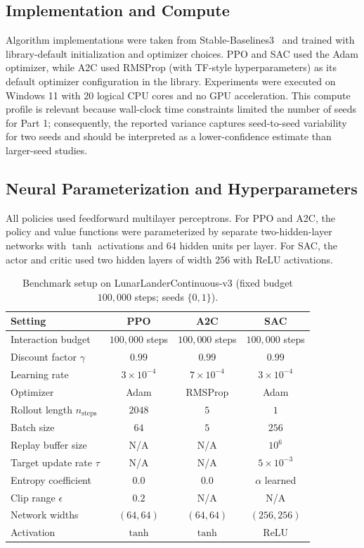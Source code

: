 \documentclass[a4paper,11pt,notitlepage]{report}
\begin{document}
\subsection{Implementation and Compute}
Algorithm implementations were taken from Stable-Baselines3~\cite{sb3} and trained with library-default initialization and optimizer choices. PPO and SAC used the Adam optimizer, while A2C used RMSProp (with TF-style hyperparameters) as its default optimizer configuration in the library. Experiments were executed on Windows 11 with 20 logical CPU cores and no GPU acceleration. This compute profile is relevant because wall-clock time constraints limited the number of seeds for Part 1; consequently, the reported variance captures seed-to-seed variability for two seeds and should be interpreted as a lower-confidence estimate than larger-seed studies.

\subsection{Neural Parameterization and Hyperparameters}
All policies used feedforward multilayer perceptrons. For PPO and A2C, the policy and value functions were parameterized by separate two-hidden-layer networks with $\tanh$ activations and $64$ hidden units per layer. For SAC, the actor and critic used two hidden layers of width $256$ with $\mathrm{ReLU}$ activations.

\begin{table}[H]
    \centering
    \caption{Benchmark setup on LunarLanderContinuous-v3 (fixed budget $100{,}000$ steps; seeds $\{0,1\}$).}
    \begin{tabular}{lccc}
        \toprule
        \textbf{Setting} & \textbf{PPO} & \textbf{A2C} & \textbf{SAC} \\
        \midrule
        Interaction budget & $100{,}000$ steps & $100{,}000$ steps & $100{,}000$ steps \\
        Discount factor $\gamma$ & $0.99$ & $0.99$ & $0.99$ \\
        Learning rate & $3\times 10^{-4}$ & $7\times 10^{-4}$ & $3\times 10^{-4}$ \\
        Optimizer & Adam & RMSProp & Adam \\
        Rollout length $n_{\mathrm{steps}}$ & $2048$ & $5$ & $1$ \\
        Batch size & $64$ & $5$ & $256$ \\
        Replay buffer size & N/A & N/A & $10^6$ \\
        Target update rate $\tau$ & N/A & N/A & $5\times 10^{-3}$ \\
        Entropy coefficient & $0.0$ & $0.0$ & $\alpha$ learned \\
        Clip range $\epsilon$ & $0.2$ & N/A & N/A \\
        Network widths & $(64,64)$ & $(64,64)$ & $(256,256)$ \\
        Activation & $\tanh$ & $\tanh$ & $\mathrm{ReLU}$ \\
        \bottomrule
    \end{tabular}
\end{table}
\end{document}
